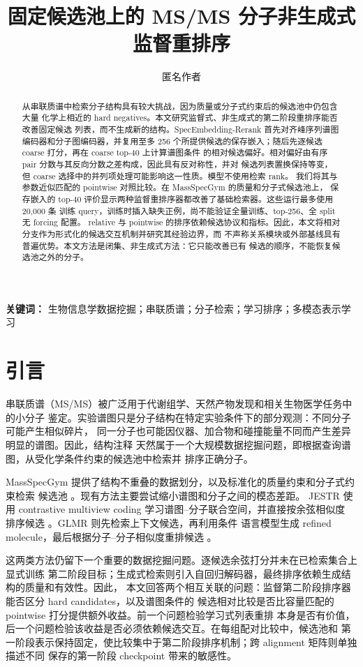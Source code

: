 \documentclass[UTF8,11pt]{ctexart}
\title{固定候选池上的 MS/MS 分子非生成式监督重排序}
\author{匿名作者}
\date{}
\newcommand{\method}{SpecEmbedding-Rerank}
\begin{document}
\maketitle

\begin{abstract}
从串联质谱中检索分子结构具有较大挑战，因为质量或分子式约束后的候选池中仍包含大量
化学上相近的 hard negatives。本文研究监督式、非生成式的第二阶段重排序能否改善固定候选
列表，而不生成新的结构。\method{} 首先对齐峰序列谱图编码器和分子图编码器，并复用至多
256 个所提供候选的保存嵌入；随后先逐候选 coarse 打分，再在 coarse top-40 上计算谱图条件
的相对候选偏好。相对偏好由有序 pair 分数与其反向分数之差构成，因此具有反对称性，并对
候选列表置换保持等变，但 coarse 选择中的并列项处理可能影响这一性质。模型不使用检索 rank。
我们将其与参数近似匹配的 pointwise 对照比较。在 MassSpecGym 的质量和分子式候选池上，
保存嵌入的 top-40 评价显示两种监督重排序器都改善了基础检索器。这些运行最多使用 20,000 条
训练 query，训练时插入缺失正例，尚不能验证全量训练、top-256、全 split 无 forcing 配置。
relative 与 pointwise 的排序依赖候选协议和指标。因此，本文将相对分支作为形式化的候选交互机制并研究其经验边界，而
不声称关系模块或外部基线具有普遍优势。本文方法是闭集、非生成式方法：它只能改善已有
候选的顺序，不能恢复候选池之外的分子。
\end{abstract}

\noindent\textbf{关键词：}
生物信息学数据挖掘；串联质谱；分子检索；学习排序；多模态表示学习

\section{引言}

串联质谱（MS/MS）被广泛用于代谢组学、天然产物发现和相关生物医学任务中的小分子
鉴定。实验谱图只是分子结构在特定实验条件下的部分观测：不同分子可能产生相似碎片，
同一分子也可能因仪器、加合物和碰撞能量不同而产生差异明显的谱图。因此，结构注释
天然属于一个大规模数据挖掘问题，即根据查询谱图，从受化学条件约束的候选池中检索并
排序正确分子。

MassSpecGym 提供了结构不重叠的数据划分，以及标准化的质量约束和分子式约束检索
候选池 \cite{bushuiev2024massspecgym}。现有方法主要尝试缩小谱图和分子之间的模态差距。
JESTR 使用 contrastive multiview coding 学习谱图--分子联合空间，并直接按余弦相似度
排序候选 \cite{kalia2025jestr,tian2020cmc}。GLMR 则先检索上下文候选，再利用条件
语言模型生成 refined molecule，最后根据分子--分子相似度重排候选
\cite{zhang2026glmr}。

这两类方法仍留下一个重要的数据挖掘问题。逐候选余弦打分并未在已检索集合上显式训练
第二阶段目标；生成式检索则引入自回归解码器，最终排序依赖生成结构的质量和有效性。因此，
本文回答两个相互关联的问题：监督第二阶段排序器能否区分 hard candidates，以及谱图条件的
候选相对比较是否比容量匹配的 pointwise 打分提供额外收益。前一个问题检验学习式列表重排
本身是否有价值，后一个问题检验该收益是否必须依赖候选交互。在每组配对比较中，候选池和
第一阶段表示保持固定，使比较集中于第二阶段排序机制；跨 alignment 矩阵则单独描述不同
保存的第一阶段 checkpoint 带来的敏感性。
\end{document}
